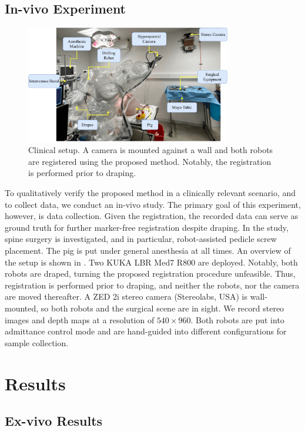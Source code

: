 \subsection{In-vivo Experiment}
\begin{figure}[tb]
    \centering
    \includegraphics[width=0.8\textwidth]{chapter_1/img/in_vivo_setup.pdf}
    \caption{Clinical setup. A camera is mounted against a wall and both robots are registered using the proposed method. Notably, the registration is performed prior to draping.}
    \label{c1:fig:in_vivo_setup}
\end{figure}
To qualitatively verify the proposed method in a clinically relevant scenario, and to collect data, we conduct an in-vivo study. The primary goal of this experiment, however, is data collection. Given the registration, the recorded data can serve as ground truth for further marker-free registration despite draping. In the study, spine surgery is investigated, and in particular, robot-assisted pedicle screw placement. The pig is put under general anesthesia at all times. An overview of the setup is shown in . Two KUKA LBR Med7 R800 are deployed. Notably, both robots are draped, turning the proposed registration procedure unfeasible. Thus, registration is performed prior to draping, and neither the robots, nor the camera are moved thereafter. A ZED 2i stereo camera (Stereolabs, USA) is wall-mounted, so both robots and the surgical scene are in sight. We record stereo images and depth maps at a resolution of $540 \times 960$. Both robots are put into admittance control mode and are hand-guided into different configurations for sample collection.

\section{Results}
\label{c1:sec:results}
\subsection{Ex-vivo Results}
